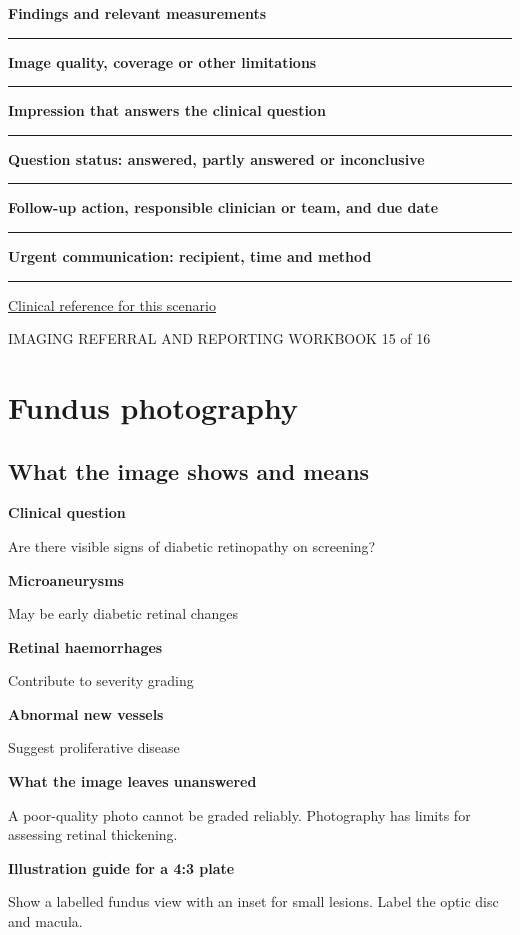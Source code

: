\documentclass[11pt,a4paper]{article}
\newcommand{\record}[1]{\textbf{#1}\par\vspace{0.55\baselineskip}\hrule\vspace{0.35\baselineskip}}
\begin{document}
\record{Findings and relevant measurements}

\record{Image quality, coverage or other limitations}

\record{Impression that answers the clinical question}

\record{Question status: answered, partly answered or inconclusive}

\record{Follow-up action, responsible clinician or team, and due date}

\record{Urgent communication: recipient, time and method}

\small\href{https://www.aaojournal.org/article/S0161-6420(19)32902-5/fulltext/}{Clinical reference for this scenario}

\normalsize

\newpage

{\small IMAGING REFERRAL AND REPORTING WORKBOOK \hfill 15 of 16}

\section*{Fundus photography}

\subsection*{What the image shows and means}

\textbf{Clinical question}\par Are there visible signs of diabetic retinopathy on screening?\par

\textbf{Microaneurysms}\par May be early diabetic retinal changes\par

\textbf{Retinal haemorrhages}\par Contribute to severity grading\par

\textbf{Abnormal new vessels}\par Suggest proliferative disease\par

\textbf{What the image leaves unanswered}\par A poor-quality photo cannot be graded reliably. Photography has limits for assessing retinal thickening.\par

\textbf{Illustration guide for a 4:3 plate}\par Show a labelled fundus view with an inset for small lesions. Label the optic disc and macula.\par
\end{document}

